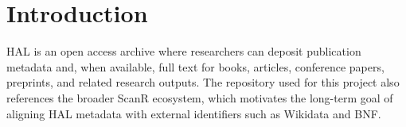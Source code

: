 \documentclass[conference]{IEEEtran}
\begin{document}
\maketitle


\begin{abstract}

\end{abstract}

\begin{IEEEkeywords}

\end{IEEEkeywords}

\section{Introduction}

HAL is an open access archive where researchers can deposit publication metadata and, when available, full text for books, articles, conference papers, preprints, and related research outputs. The repository used for this project also references the broader ScanR ecosystem, which motivates the long-term goal of aligning HAL metadata with external identifiers such as Wikidata and BNF.
\end{document}
